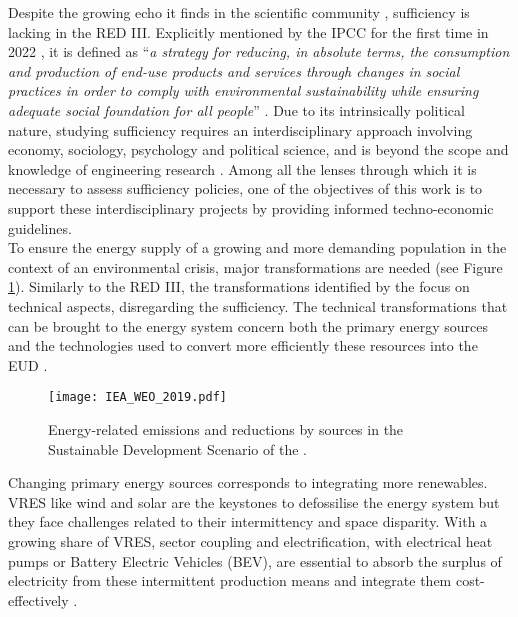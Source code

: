 Despite the growing echo it finds in the scientific community \cite{o2018good}, sufficiency is lacking in the RED III. Explicitly mentioned by the IPCC for the first time in 2022 \cite{IPCC2022}, it is defined as ``\emph{a strategy for reducing, in absolute terms, the consumption and production of end-use products and services through changes in social practices in order to comply with environmental sustainability while ensuring adequate social foundation for all people}'' \cite{lage2023citizens}. Due to its intrinsically political nature, studying sufficiency requires an interdisciplinary approach involving economy, sociology, psychology and political science, and is beyond the scope and knowledge of engineering research \cite{schmidt2015interdisciplinary}. Among all the lenses through which it is necessary to assess sufficiency policies, one of the objectives of this work is to support these interdisciplinary projects by providing informed techno-economic guidelines.\\

\noindent
To ensure the energy supply of a growing and more demanding population in the context of an environmental crisis, major transformations are needed (see Figure \ref{fig:intro:IEA_WEO_2019}). Similarly to the RED III, the transformations identified by the \citet{iea2020world} focus on technical aspects, disregarding the sufficiency.  The technical transformations that can be brought to the energy system concern both the primary energy sources and the technologies used to convert more efficiently these resources into the \gls{EUD} \cite{iea2020world,luderer2018residual}. 

\begin{figure}[ht!]
\centering
\texttt{[image: IEA\_WEO\_2019.pdf]}
\caption{Energy-related  emissions and reductions by sources in the Sustainable Development Scenario of the \citet{iea2020world}.}
\label{fig:intro:IEA_WEO_2019}
\end{figure}

Changing primary energy sources corresponds to integrating more renewables. \gls{VRES} like wind and solar are the keystones to defossilise the energy system but they face challenges related to their intermittency and space disparity.  With a growing share of \gls{VRES}, sector coupling and electrification, with electrical heat pumps or Battery Electric Vehicles (BEV), are essential to absorb the surplus of electricity from these intermittent production means \cite{robinius2017linking} and integrate them cost-effectively \cite{brown2018response, limpensECOS2021}. 

